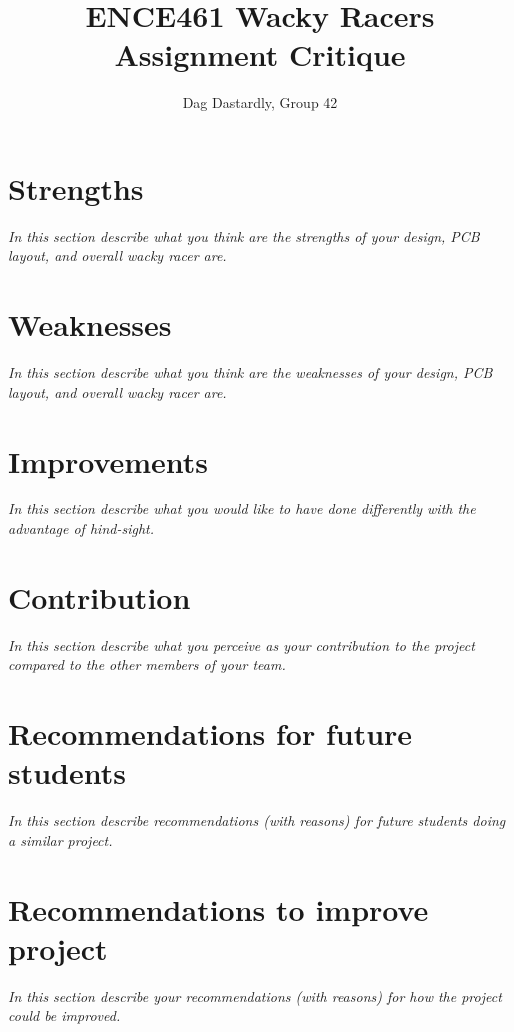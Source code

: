 \documentclass[a4paper,12pt]{article}
\title{ENCE461 Wacky Racers Assignment Critique}
\author{Dag Dastardly, Group 42}
\date{}
\begin{document}
\maketitle

\section{Strengths}

\emph{In this section describe what you think are the strengths of
  your design, PCB layout, and overall wacky racer are.}


\section{Weaknesses}

\emph{In this section describe what you think are the weaknesses of
  your design, PCB layout, and overall wacky racer are.}


\section{Improvements}

\emph{In this section describe what you would like to have done
  differently with the advantage of hind-sight.}


\section{Contribution}

\emph{In this section describe what you perceive as your contribution
  to the project compared to the other members of your team.}



\section{Recommendations for future students}

\emph{In this section describe recommendations (with reasons) for
  future students doing a similar project.}



\section{Recommendations to improve project}

\emph{In this section describe your recommendations (with reasons) for
  how the project could be improved.}
\end{document}
